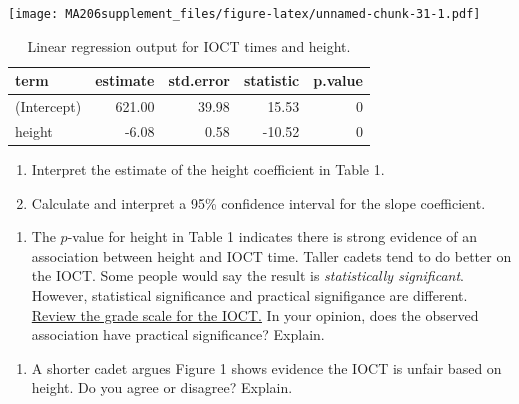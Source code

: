 \documentclass[
]{book}
\providecommand{\tightlist}{%
  \setlength{\itemsep}{0pt}\setlength{\parskip}{0pt}}
\begin{document}
\texttt{[image: MA206supplement\_files/figure-latex/unnamed-chunk-31-1.pdf]}

\begin{table}

\caption{\label{tab:unnamed-chunk-31}Linear regression output for IOCT times and height.}
\centering
\begin{tabular}[t]{l|r|r|r|r}
\hline
term & estimate & std.error & statistic & p.value\\
\hline
(Intercept) & 621.00 & 39.98 & 15.53 & 0\\
\hline
height & -6.08 & 0.58 & -10.52 & 0\\
\hline
\end{tabular}
\end{table}

\begin{enumerate}
\def\labelenumi{\arabic{enumi}.}
\setcounter{enumi}{4}
\item
  Interpret the estimate of the height coefficient in Table 1.

  \vspace{1in}
\item
  Calculate and interpret a 95\% confidence interval for the slope coefficient.
\end{enumerate}

\vspace{1in}

\newpage

\begin{enumerate}
\def\labelenumi{\arabic{enumi}.}
\setcounter{enumi}{6}
\tightlist
\item
  The \(p\)-value for height in Table 1 indicates there is strong evidence of an association between height and IOCT time. Taller cadets tend to do better on the IOCT. Some people would say the result is \emph{statistically significant}. However, statistical significance and practical signifigance are different. \href{https://en.wikipedia.org/wiki/Indoor_Obstacle_Course_Test}{Review the grade scale for the IOCT.} In your opinion, does the observed association have practical significance? Explain.
\end{enumerate}

\vspace{1in}

\begin{enumerate}
\def\labelenumi{\arabic{enumi}.}
\setcounter{enumi}{7}
\tightlist
\item
  A shorter cadet argues Figure 1 shows evidence the IOCT is unfair based on height. Do you agree or disagree? Explain.
\end{enumerate}
\end{document}
